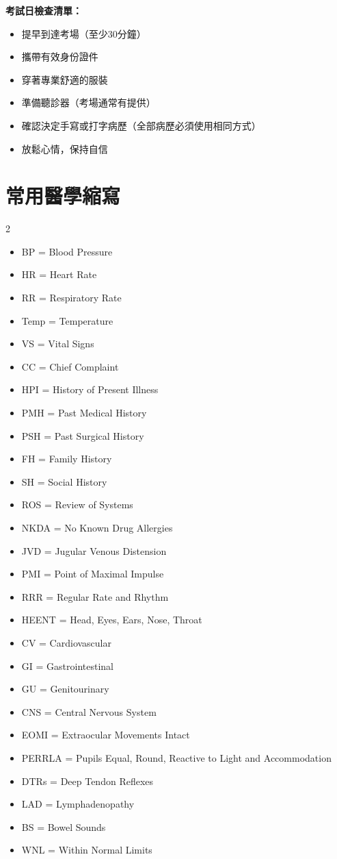 \documentclass[12pt,a4paper]{article}
\begin{document}
\begin{importantbox}
\textbf{考試日檢查清單：}
\begin{itemize}
    \item 提早到達考場（至少30分鐘）
    \item 攜帶有效身份證件
    \item 穿著專業舒適的服裝
    \item 準備聽診器（考場通常有提供）
    \item 確認決定手寫或打字病歷（全部病歷必須使用相同方式）
    \item 放鬆心情，保持自信
\end{itemize}
\end{importantbox}

\section{常用醫學縮寫}

\begin{multicols}{2}
\begin{itemize}
    \item BP = Blood Pressure
    \item HR = Heart Rate
    \item RR = Respiratory Rate
    \item Temp = Temperature
    \item VS = Vital Signs
    \item CC = Chief Complaint
    \item HPI = History of Present Illness
    \item PMH = Past Medical History
    \item PSH = Past Surgical History
    \item FH = Family History
    \item SH = Social History
    \item ROS = Review of Systems
    \item NKDA = No Known Drug Allergies
    \item JVD = Jugular Venous Distension
    \item PMI = Point of Maximal Impulse
    \item RRR = Regular Rate and Rhythm
    \item HEENT = Head, Eyes, Ears, Nose, Throat
    \item CV = Cardiovascular
    \item GI = Gastrointestinal
    \item GU = Genitourinary
    \item CNS = Central Nervous System
    \item EOMI = Extraocular Movements Intact
    \item PERRLA = Pupils Equal, Round, Reactive to Light and Accommodation
    \item DTRs = Deep Tendon Reflexes
    \item LAD = Lymphadenopathy
    \item BS = Bowel Sounds
    \item WNL = Within Normal Limits
\end{itemize}
\end{multicols}
\end{document}
